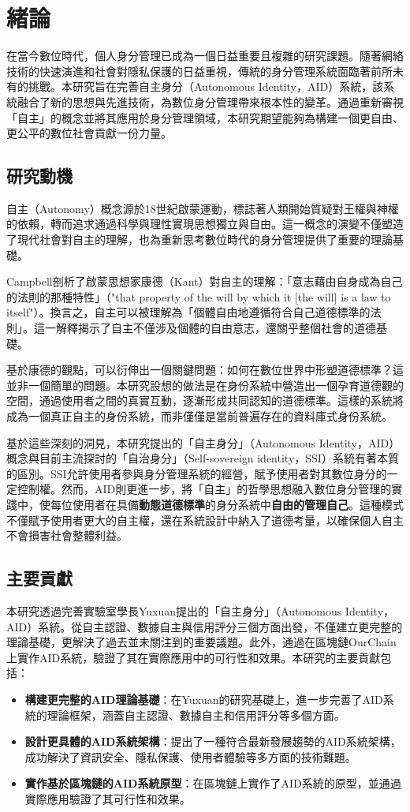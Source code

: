 
\chapter{緒論}
在當今數位時代，個人身分管理已成為一個日益重要且複雜的研究課題。隨著網絡技術的快速演進和社會對隱私保護的日益重視，傳統的身分管理系統面臨著前所未有的挑戰。本研究旨在完善自主身分（Autonomous Identity，AID）系統，該系統融合了新的思想與先進技術，為數位身分管理帶來根本性的變革。通過重新審視「自主」的概念並將其應用於身分管理領域，本研究期望能夠為構建一個更自由、更公平的數位社會貢獻一份力量。
\section{研究動機}
自主（Autonomy）概念源於18世紀啟蒙運動，標誌著人類開始質疑對王權與神權的依賴，轉而追求通過科學與理性實現思想獨立與自由。這一概念的演變不僅塑造了現代社會對自主的理解，也為重新思考數位時代的身分管理提供了重要的理論基礎。

Campbell\cite{CAMPBELL2017381}剖析了啟蒙思想家康德（Kant）對自主的理解：「意志藉由自身成為自己的法則的那種特性」（"that property of the will by which it [the will] is a law to itself"）。換言之，自主可以被理解為「個體自由地遵循符合自己道德標準的法則」。這一解釋揭示了自主不僅涉及個體的自由意志，還關乎整個社會的道德基礎。

基於康德的觀點，可以衍伸出一個關鍵問題：如何在數位世界中形塑道德標準？這並非一個簡單的問題。本研究設想的做法是在身份系統中營造出一個孕育道德觀的空間，通過使用者之間的真實互動，逐漸形成共同認知的道德標準。這樣的系統將成為一個真正自主的身份系統，而非僅僅是當前普遍存在的資料庫式身份系統。

基於這些深刻的洞見，本研究提出的「自主身分」（Autonomous Identity，AID）概念與目前主流探討的「自治身分」（Self-sovereign identity，SSI）系統有著本質的區別。SSI允許使用者參與身分管理系統的經營，賦予使用者對其數位身分的一定控制權。然而，AID則更進一步，將「自主」的哲學思想融入數位身分管理的實踐中，使每位使用者在具備\textbf{動態道德標準}的身分系統中\textbf{自由的管理自己}。這種模式不僅賦予使用者更大的自主權，還在系統設計中納入了道德考量，以確保個人自主不會損害社會整體利益。
\section{主要貢獻}
本研究透過完善實驗室學長Yuxuan\cite{ntu-lin2014autonomous}提出的「自主身分」（Autonomous Identity，AID）系統。從自主認證、數據自主與信用評分三個方面出發，不僅建立更完整的理論基礎，更解決了過去並未關注到的重要議題。此外，通過在區塊鏈OurChain\cite{ourlab408_ourchain}上實作AID系統，驗證了其在實際應用中的可行性和效果。本研究的主要貢獻包括：
\begin{itemize}
  \item \textbf{構建更完整的AID理論基礎}：在Yuxuan的研究基礎上，進一步完善了AID系統的理論框架，涵蓋自主認證、數據自主和信用評分等多個方面。
  \item \textbf{設計更具體的AID系統架構}：提出了一種符合最新發展趨勢的AID系統架構，成功解決了資訊安全、隱私保護、使用者體驗等多方面的技術難題。
  \item \textbf{實作基於區塊鏈的AID系統原型}：在區塊鏈上實作了AID系統的原型，並通過實際應用驗證了其可行性和效果。
\end{itemize}
